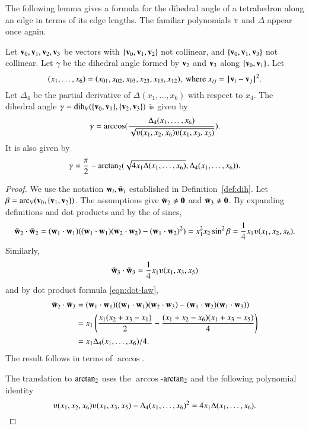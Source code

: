 The following lemma gives a formula for the dihedral angle
of a tetrahedron along an edge in terms of its edge lengths.  The
familiar polynomials $\ups$ and $\Delta$ appear once again.
%
%


\begin{lemma}[]\label{lemma:dihform}
Let ${\mathbf v}_0,{\mathbf v}_1,{\mathbf v}_2,{\mathbf v}_3$ 
be vectors with $\{{\mathbf v}_0,{\mathbf v}_1,{\mathbf v}_2\}$ not collinear, 
and $\{{\mathbf v}_0,{\mathbf v}_1,{\mathbf v}_3\}$ not
collinear. 
Let $\gamma$ be the dihedral angle formed
by ${\mathbf v}_2$ and ${\mathbf v}_3$ along $\{{\mathbf v}_0,{\mathbf v}_1\}$. Let
\[ (x_1,\ldots,x_6) = 
(x_{01},x_{02},x_{03},x_{23},x_{13},x_{12}),
\text{ where } x_{ij}=\norm{\v_i}{\v_j}^2.\] 
Let $\Delta_4$ be the partial derivative of $\Delta(x_1,\ldots,x_6)$ with
respect to $x_4$.
The dihedral angle $\gamma=\operatorname{dih}_V(\{{\mathbf v}_0,{\mathbf v}_1\},\{{\mathbf v}_2,{\mathbf v}_3\})$
is given by
\[ 
\gamma=\arccos(\frac{\Delta_4(x_1,\ldots,x_6)}{\sqrt{
\ups(x_1,x_2,x_6)\ups(x_1,x_3,x_5)}}).
\] 
It is also given by
\[ 
\gamma=\frac{\pi}{2} - {\operatorname{arctan_2}}
({\sqrt{4 x_1 \Delta(x_1,\ldots,x_6)}},{\Delta_4(x_1,\ldots,x_6)}).
\] 
\end{lemma}
%


\begin{proof}  We use the notation ${\mathbf w}_i, \bar {{\mathbf w}}_i$ established in Definition~\ref{def:dih}.
  Let $\beta = \operatorname{arc}_V({\mathbf v}_0,\{{\mathbf v}_1,{\mathbf v}_2\})$.  The assumptions give
  $\bar {{\mathbf w}}_2\ne {\mathbf 0}$ and $\bar {{\mathbf w}}_3 \ne {\mathbf 0}$.  %
  By expanding definitions and dot products and by the
   of sines,
\[ 
  \bar \w_2\cdot \bar \w_2 = (\w_1\cdot \w_1) ((\w_1\cdot \w_1)(\w_2\cdot \w_2) -
  (\w_1\cdot \w_2)^2) =  x_1^2 x_2 \sin^2 \beta = \frac{1}{4}
  x_1
  \ups(x_1,x_2,x_6).
\] 
Similarly,
\[ \bar \w_3 \cdot \bar \w_3 = \frac{1}{4} x_1
  \ups(x_1,x_3,x_5)\] 
and by dot product formula \eqref{eqn:dot-law},
\begin{align*}
    \bar \w_2\cdot \bar \w_3 &= (\w_1\cdot \w_1)((\w_1\cdot \w_1)(\w_2\cdot \w_3) -
    (\w_1\cdot \w_2)(\w_1\cdot \w_3) ) \vspace{6pt} \\  
    &= x_1 \left(\frac{\displaystyle x_1 (x_2 + x_3 -
        x_1)}{2} - \frac{\displaystyle (x_1 + x_2 - x_6)(x_1 + x_3 -
        x_5)}{4} \right)\vspace{6pt}\\
&= {x_1\Delta_4(x_1,\ldots,x_6)}/{4}.
\end{align*}
The result follows in terms of $\arccos$.

The translation to ${\operatorname{arctan_2}}$ uses the $\arccos$-${\operatorname{arctan_2}}$
 and the following polynomial
identity
\[ 
\ups(x_1,x_2,x_6)\ups(x_1,x_3,x_5) - \Delta_4(x_1,\ldots,x_6)^2
= 4 x_1 \Delta(x_1,\ldots,x_6).
\] 
\end{proof}

